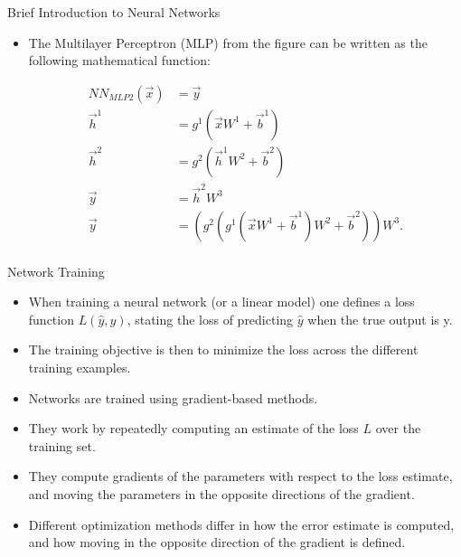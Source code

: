 \documentclass[handout]{beamer}
\begin{document}
\begin{frame}{Brief Introduction to Neural Networks}
\begin{scriptsize}
\begin{itemize}
\item The Multilayer Perceptron (MLP) from the figure can be written as the following mathematical function:
\begin{center}
\begin{equation}
\begin{split}
NN_{MLP2}(\vec{x}) & =  \vec{y}  \\
\vec{h}^{1} &  = g^{1}(\vec{x}W^{1}+\vec{b}^{1}) \\
\vec{h}^{2} &  = g^{2}(\vec{h}^{1}W^{2}+\vec{b}^{2}) \\
\vec{y} &  = \vec{h}^{2}W^{3}\\
\vec{y} &  = (g^2(g^1(\vec{x}W^{1}+\vec{b}^{1})W^2+\vec{b}^2))W^3.\\
\end{split}
\end{equation}
\end{center}

\end{itemize}


\end{scriptsize}
\end{frame}


\begin{frame}{Network Training}
\begin{scriptsize}
\begin{itemize}
\item  When training a neural network (or a linear model) one defines a loss function $L(\hat{y}, y)$, stating the loss of predicting $\hat{y}$ when the true output is y.

\item The training objective is then to minimize the loss across the different training examples. 

\item Networks are trained using  gradient-based methods.

\item They work by repeatedly computing an estimate of the loss $L$ over the training set.

\item They compute gradients of the parameters with respect to the loss estimate, and moving the parameters in the opposite directions of the gradient. 

\item Different optimization methods differ in how the error estimate is computed, and how moving in the opposite direction of the gradient is defined.

\end{itemize}


\end{scriptsize}
\end{frame}
\end{document}
